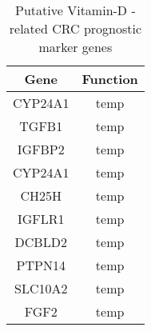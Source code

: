 \documentclass[fleqn,10pt]{SelfArx} %
\begin{document}
\begin{table}[ht]
	\centering
	\begin{tabular}{cc}
		\hline
		Gene & Function\\
		\hline
		CYP24A1& temp\\
		TGFB1& temp\\
		IGFBP2& temp\\
		CYP24A1& temp\\
		CH25H& temp\\
		IGFLR1& temp\\
		DCBLD2& temp\\
		PTPN14& temp\\
		SLC10A2& temp\\
		FGF2& temp\\
		\hline
	\end{tabular}
	\label{tab:suvmark}
	\caption{Putative Vitamin-D -related CRC prognostic marker genes}
\end{table}
\end{document}
